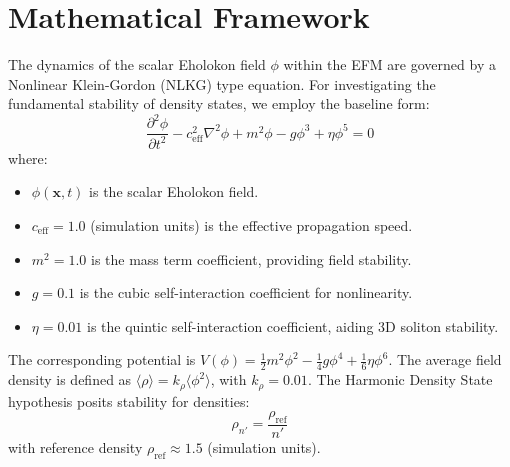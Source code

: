 \documentclass[11pt]{article}
\begin{document}
\section{Mathematical Framework}
The dynamics of the scalar Eholokon field \(\phi\) within the EFM are governed by a Nonlinear Klein-Gordon (NLKG) type equation. For investigating the fundamental stability of density states, we employ the baseline form:
\begin{equation}
\frac{\partial^2 \phi}{\partial t^2} - c_{\text{eff}}^2 \nabla^2 \phi + m^2 \phi - g \phi^3 + \eta \phi^5 = 0
\label{eq:nlkg_baseline}
\end{equation}
where:
\begin{itemize}
    \item \(\phi(\mathbf{x}, t)\) is the scalar Eholokon field.
    \item \(c_{\text{eff}} = 1.0\) (simulation units) is the effective propagation speed.
    \item \(m^2 = 1.0\) is the mass term coefficient, providing field stability.
    \item \(g = 0.1\) is the cubic self-interaction coefficient for nonlinearity.
    \item \(\eta = 0.01\) is the quintic self-interaction coefficient, aiding 3D soliton stability.
\end{itemize}
The corresponding potential is \(V(\phi) = \frac{1}{2}m^2\phi^2 - \frac{1}{4}g\phi^4 + \frac{1}{6}\eta\phi^6\).
The average field density is defined as \(\langle\rho\rangle = k_{\rho} \langle\phi^2\rangle\), with \(k_{\rho} = 0.01\). The Harmonic Density State hypothesis posits stability for densities:
\begin{equation}
\rho_{n'} = \frac{\rho_{\text{ref}}}{n'}
\label{eq:hds_relation}
\end{equation}
with reference density \(\rho_{\text{ref}} \approx 1.5\) (simulation units).
\end{document}
